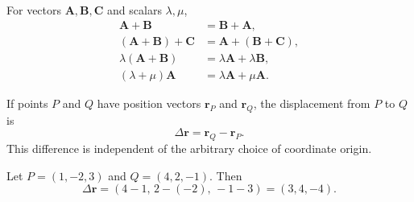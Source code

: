 \begin{propertybox}
For vectors $\mathbf A,\mathbf B,\mathbf C$ and scalars $\lambda,\mu$,
\begin{align*}
\mathbf A+\mathbf B&=\mathbf B+\mathbf A,\\
(\mathbf A+\mathbf B)+\mathbf C&=\mathbf A+(\mathbf B+\mathbf C),\\
\lambda(\mathbf A+\mathbf B)&=\lambda\mathbf A+\lambda\mathbf B,\\
(\lambda+\mu)\mathbf A&=\lambda\mathbf A+\mu\mathbf A.
\end{align*}
\end{propertybox}


If points $P$ and $Q$ have position vectors $\mathbf r_P$ and $\mathbf r_Q$, the displacement from $P$ to $Q$ is
\[
\Delta\mathbf r=\mathbf r_Q-\mathbf r_P.
\]
This difference is independent of the arbitrary choice of coordinate origin.

\begin{workedexample}
Let $P=(1,-2,3)$ and $Q=(4,2,-1)$. Then
\[
\Delta\mathbf r=(4-1,\,2-(-2),\,-1-3)=(3,4,-4).
\]
\end{workedexample}
